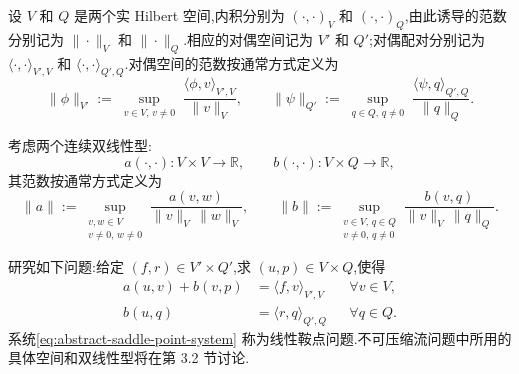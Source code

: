 \begin{note}[抽象线性鞍点问题]\label{note:abstract-saddle-point-problem}
设 $V$ 和 $Q$ 是两个实 Hilbert 空间,内积分别为 $(\cdot,\cdot)_V$ 和 $(\cdot,\cdot)_Q$,由此诱导的范数分别记为 $\|\cdot\|_V$ 和 $\|\cdot\|_Q$.相应的对偶空间记为 $V'$ 和 $Q'$;对偶配对分别记为 $\langle\cdot,\cdot\rangle_{V',V}$ 和 $\langle\cdot,\cdot\rangle_{Q',Q}$.对偶空间的范数按通常方式定义为
\begin{equation}\label{eq:dual-space-norms}
  \|\phi\|_{V'}:=\sup_{\substack{v\in V,\,v\ne0}}
    \frac{\langle\phi,v\rangle_{V',V}}{\|v\|_V},
  \qquad
  \|\psi\|_{Q'}:=\sup_{\substack{q\in Q,\,q\ne0}}
    \frac{\langle\psi,q\rangle_{Q',Q}}{\|q\|_Q}.
\end{equation}

考虑两个连续双线性型:
\begin{equation}\label{eq:bilinear-forms}
  a(\cdot,\cdot):V\times V\to\mathbb{R},
  \qquad
  b(\cdot,\cdot):V\times Q\to\mathbb{R},
\end{equation}
其范数按通常方式定义为
\begin{equation}\label{eq:bilinear-form-norms}
  \|a\|:=\sup_{\substack{v,w\in V\\v\ne0,\,w\ne0}}
       \frac{a(v,w)}{\|v\|_V\,\|w\|_V},
  \qquad
  \|b\|:=\sup_{\substack{v\in V,\,q\in Q\\v\ne0,\,q\ne0}}
       \frac{b(v,q)}{\|v\|_V\,\|q\|_Q}.
\end{equation}

研究如下问题:给定 $(f,r)\in V'\times Q'$,求 $(u,p)\in V\times Q$,使得
\begin{equation}\label{eq:abstract-saddle-point-system}
\begin{aligned}
  a(u,v)+b(v,p)&=\langle f,v\rangle_{V',V}
     &&\forall v\in V,\\
  b(u,q)&=\langle r,q\rangle_{Q',Q}
     &&\forall q\in Q.
\end{aligned}
\end{equation}
系统\cref{eq:abstract-saddle-point-system} 称为线性鞍点问题.不可压缩流问题中所用的具体空间和双线性型将在第 3.2 节讨论.
\end{note}

